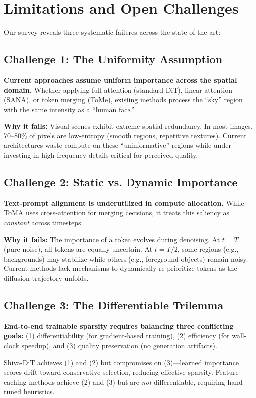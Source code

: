 \documentclass{article}
\begin{document}
\section{Limitations and Open Challenges}

Our survey reveals three systematic failures across the state-of-the-art:

\subsection{Challenge 1: The Uniformity Assumption}
\textbf{Current approaches assume uniform importance across the spatial
    domain.} Whether applying full attention (standard DiT), linear attention
(SANA), or token merging (ToMe), existing methods process the ``sky''
region with the same intensity as a ``human face.''

\textbf{Why it fails:} Visual scenes exhibit extreme spatial redundancy.
In most images, 70--80\% of pixels are low-entropy (smooth regions,
repetitive textures). Current architectures waste compute on these
``uninformative'' regions while under-investing in high-frequency details
critical for perceived quality.

\subsection{Challenge 2: Static vs. Dynamic Importance}
\textbf{Text-prompt alignment is underutilized in compute allocation.}
While ToMA uses cross-attention for merging decisions, it treats this
saliency as \textit{constant} across timesteps.

\textbf{Why it fails:} The importance of a token evolves during
denoising. At $t=T$ (pure noise), all tokens are equally uncertain.
At $t=T/2$, some regions (e.g., backgrounds) may stabilize while others
(e.g., foreground objects) remain noisy. Current methods lack mechanisms
to dynamically re-prioritize tokens as the diffusion trajectory unfolds.

\subsection{Challenge 3: The Differentiable Trilemma}
\textbf{End-to-end trainable sparsity requires balancing three conflicting
    goals:} (1) differentiability (for gradient-based training), (2) efficiency
(for wall-clock speedup), and (3) quality preservation (no generation
artifacts).

Shiva-DiT achieves (1) and (2) but compromises on (3)—learned importance
scores drift toward conservative selection, reducing effective sparsity.
Feature caching methods achieve (2) and (3) but are \textit{not}
differentiable, requiring hand-tuned heuristics.
\end{document}
